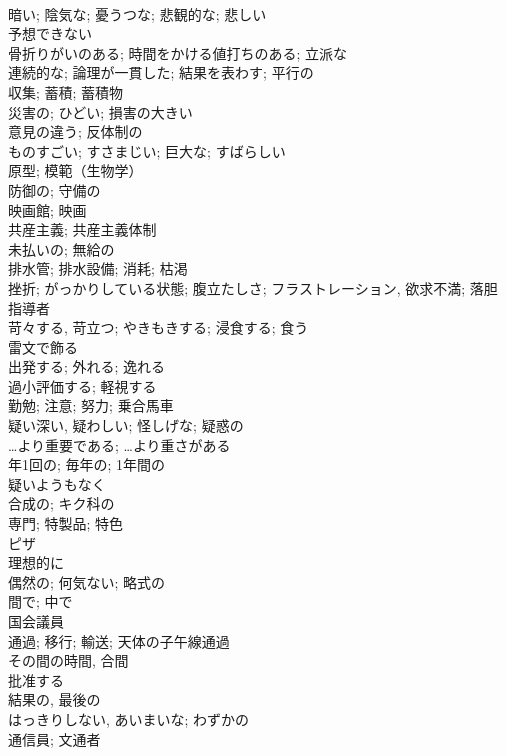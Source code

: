 \documentclass[8pt]{extreport}
\begin{document}
\begin{CJK}{UTF8}{min}
\\	暗い; 陰気な; 憂うつな; 悲観的な; 悲しい	
\\	予想できない	
\\	骨折りがいのある; 時間をかける値打ちのある; 立派な	
\\	連続的な; 論理が一貫した; 結果を表わす; 平行の	
\\	収集; 蓄積; 蓄積物	
\\	災害の; ひどい; 損害の大きい	
\\	意見の違う; 反体制の	
\\	ものすごい; すさまじい; 巨大な; すばらしい	
\\	原型; 模範（生物学）	
\\	防御の; 守備の	
\\	映画館; 映画	
\\	共産主義; 共産主義体制	
\\	未払いの; 無給の	
\\	排水管; 排水設備; 消耗; 枯渇	
\\	挫折; がっかりしている状態; 腹立たしさ; フラストレーション, 欲求不満; 落胆	
\\	指導者	
\\	苛々する, 苛立つ; やきもきする; 浸食する; 食う 
\\	雷文で飾る	
\\	出発する; 外れる; 逸れる	
\\	過小評価する; 軽視する	
\\	勤勉; 注意; 努力; 乗合馬車	
\\	疑い深い, 疑わしい; 怪しげな; 疑惑の	
\\	…より重要である; …より重さがある	
\\	年1回の; 毎年の; 1年間の	
\\	疑いようもなく	
\\	合成の; キク科の	
\\	専門; 特製品; 特色	
\\	ピザ	
\\	理想的に	
\\	偶然の; 何気ない; 略式の	
\\	間で; 中で	
\\	国会議員	
\\	通過; 移行; 輸送; 天体の子午線通過	
\\	その間の時間, 合間	
\\	批准する	
\\	結果の, 最後の	
\\	はっきりしない, あいまいな; わずかの	
\\	通信員; 文通者	

\end{CJK}
\end{document}
